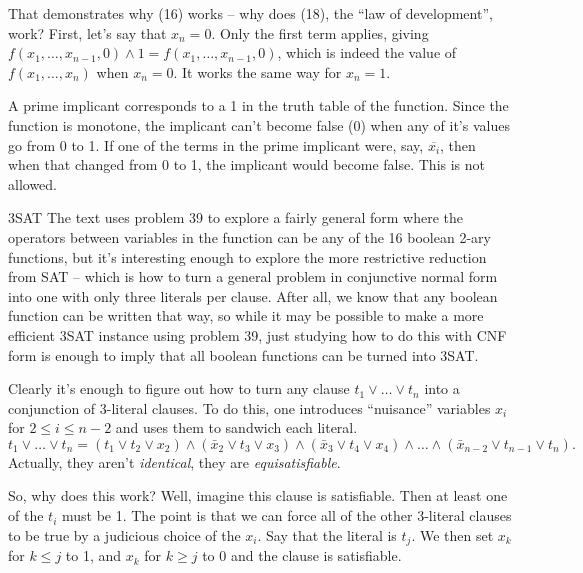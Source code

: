 \vskip 0.05in
\noindent [p52] That demonstrates why (16) works -- why does (18), 
the ``law of development'', work?\hfil\break
First, let's say that $x_n = 0$.  Only the first term applies, giving
$f\left(x_1,\ldots,x_{n-1},0\right) \wedge 1 = f\left(x_1,\ldots,x_{n-1},0\right)$,
which is indeed the value of $f\left( x_1,\ldots,x_n \right)$ when $x_n = 0$.
It works the same way for $x_n = 1$.

\vskip 0.05in \hfil\break 
A prime implicant corresponds to a 1 in the
truth table of the function.  Since the function is monotone, the implicant
can't become false (0) when any of it's values go from 0 to 1.  If one
of the terms in the prime implicant were, say, $\overline{x_i}$, then
when that changed from 0 to 1, the implicant would become false.  This
is not allowed.

\vskip0.1in 

\noindent [p56] 3SAT\hfil\break
The text uses problem 39 to explore a fairly general form where the 
operators between variables
in the function can be any of the 16 boolean 2-ary functions, but it's
interesting enough to explore the more restrictive reduction from SAT --
which is how to turn a general problem in conjunctive normal form
into one with only three literals per clause.  After all, we know that
any boolean function can be written that way, so while it may be
possible to make a more efficient 3SAT instance using problem 39,
just studying how to do this with CNF form is enough to imply that
all boolean functions can be turned into 3SAT.

Clearly it's enough to figure out how to turn any clause $t_1 \vee \ldots
\vee t_n$ into a conjunction of 3-literal clauses.  To do this, one introduces
``nuisance'' variables $x_i$ for $2 \leq i \leq n - 2$ and uses them to sandwich
each literal.
$$
t_1 \vee \ldots \vee t_n = \left(t_1 \vee t_2 \vee x_2\right)
\land \left(\bar x_2 \vee t_3 \vee x_3\right)
\land \left(\bar x_3 \vee t_4 \vee x_4\right)
\land \ldots \land \left(\bar x_{n-2} \vee t_{n-1} \vee t_n\right) .
$$
Actually, they aren't {\it identical}, they are {\it equisatisfiable}.

So, why does this work?  Well, imagine this clause is satisfiable.
Then at least one of the $t_i$ must be 1. 
The point is that we can force all of the other 3-literal clauses
to be true by a judicious choice of the $x_i$.   Say that the
literal is $t_j$.  We then set $x_k$ for $k \le j$ to 1,
and $x_k$ for $k \geq j$ to 0 and the clause is satisfiable.

